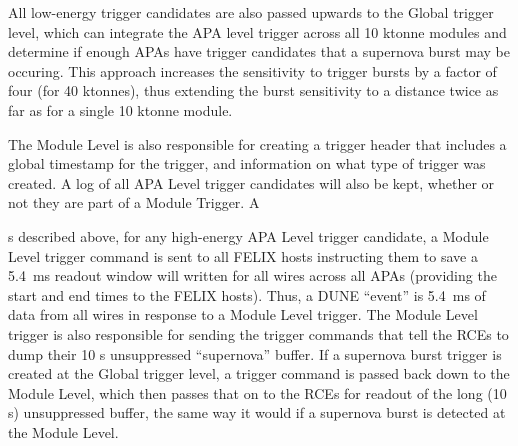 All low-energy trigger candidates are also passed upwards to the Global trigger
level, which can integrate the APA level trigger across all 10 ktonne modules
and determine if enough APAs have trigger candidates that a supernova burst may
be occuring. This approach increases the sensitivity to trigger bursts by a
factor of four (for 40 ktonnes), thus extending the burst sensitivity to a
distance twice as far as for a single 10 ktonne module. 

	The Module Level is also responsible for creating a trigger header that
includes a global timestamp for the trigger, and information on what type of
trigger was created. A log of all APA Level trigger candidates will also be
kept, whether or not they are part of a Module Trigger.  A

s described above, for any high-energy APA Level trigger candidate, a Module
Level trigger command is sent  to all FELIX hosts instructing them to save a
5.4~ms readout window will written for all wires across all APAs 
(providing the start and end times to the FELIX hosts).  Thus, a DUNE ``event''
is 5.4~ms of data from all wires in response to a Module Level trigger.  The
Module Level trigger is also responsible for sending the trigger commands that
tell the RCEs to dump their 10 s unsuppressed ``supernova'' buffer.  If a
supernova burst trigger is created at the Global trigger level, a trigger
command is passed back down to the Module Level, which then passes that on to
the RCEs for readout of the long (10 s) unsuppressed buffer, the same way it
would if a supernova burst is detected at the Module Level. 

	


%

%
%
%

